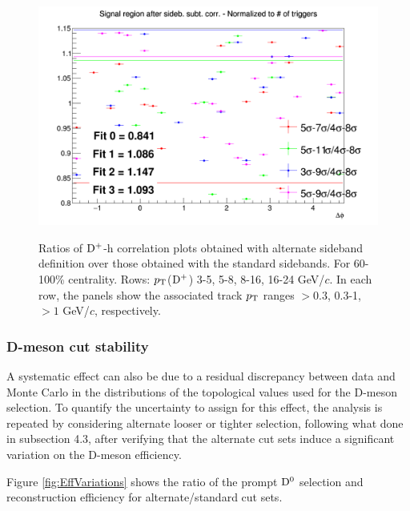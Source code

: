 \begin{figure}
{\includegraphics[width=0.31\linewidth]{Centrality_DPlus/Dplus/Systematic/60_100/Side_band_60_100/Ratio_AzimCorrDistr_Dplus_Canvas_PtIntBins11to11_PoolInt_thr1dotto99dot.png}} \\
 \caption{Ratios of ${\rm D^+}$-h correlation plots obtained with alternate sideband definition over those obtained with the standard sidebands. For 60-100\% centrality. Rows: $p_{\rm T}$(${\rm D^+}$) 3-5, 5-8, 8-16, 16-24 GeV/$c$. In each row, the panels show the associated track $p_{\rm T}$ ranges $> 0.3$, 0.3-1, $> 1$ GeV/$c$, respectively.}
\label{fig:SysBkg60100_Dplus}
\end{figure}

\subsubsection{D-meson cut stability}
A systematic effect can also be due to a residual discrepancy between data and Monte Carlo in the distributions of the topological values used for the D-meson selection. To quantify the uncertainty to assign for this effect, the analysis is repeated by considering alternate looser or tighter selection, following what done in subsection 4.3, after verifying that the alternate cut sets induce a significant variation on the D-meson efficiency.

Figure \ref{fig:EffVariations} shows the ratio of the prompt ${\rm D^0}$ selection and reconstruction efficiency for alternate/standard cut sets.

